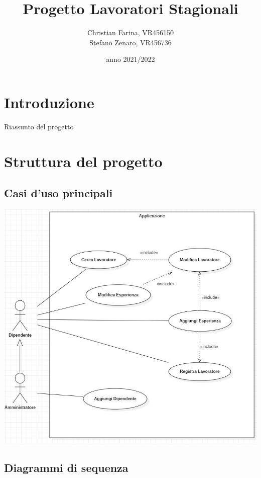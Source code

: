 \documentclass[ 4paper,11pt,openany]{book}
\title{Progetto Lavoratori Stagionali}
\author{Christian Farina, VR456150\\  Stefano Zenaro, VR456736}
\date{anno 2021/2022}
\begin{document}
\frontmatter
\maketitle
\tableofcontents 

\mainmatter
\chapter{Introduzione}
Riassunto del progetto
 
\chapter{Struttura del progetto}%
\section{Casi d'uso principali}
\includegraphics[width=180mm]{casi.jpg}
\section{Diagrammi di sequenza}
\end{document}
